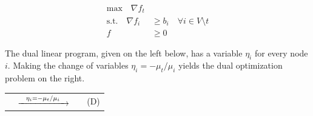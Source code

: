 \documentclass[11pt]{article}
\theoremstyle{definition}
\theoremstyle{definition}
\theoremstyle{definition}
\newcommand{\R}{\mathbb{R}}
\newcommand{\gij}{\gamma_{ij}}
\begin{document}
    \begin{align*}\tag{P}
    \text{max} \quad
    \nabla f_t& \\
    \text{s.t.} \quad
    \nabla f_i &\geq b_i \quad \forall i \in V \setminus t \\
    f &\geq 0
    \end{align*}

	The dual linear program, given on the left below, has a variable $\eta_i$ for
	every node $i$. 
	Making the change of variables $\eta_i = - \mu_t / \mu_i$ yields the
	dual optimization problem on the right.
    \vspace{0.5cm}

	\begin{tabular}{rcll}
		\hspace*{-1.05cm}
	\resizebox{0.37\textwidth}{!}{
		\fbox{
	\begin{minipage}{0.35\textwidth}
	\begin{alignat*}{4}
    \text{min} &\quad &\sum_{i \in V \setminus t} b_i \eta_i \\
    \text{s.t.}
    &   &\gij \eta_j - \eta_i &\geq 0 \quad &&\forall\; &&(i, j) \in E \\
    &   &                     &             &&          &&\ i, j \neq t \\
    &   &\gamma_{ti} \eta_i &\geq -1 \quad  &&\forall\; &&(i, t) \in E \\
    &   &-\eta_i &\geq \gamma_{it} \quad    &&\forall\; &&(t, i) \in E \\
    &   &\eta_i &\leq 0 \quad               &&\forall\; &&i \in V \setminus t
    \end{alignat*}
	\end{minipage}
}
} & 
	$\xrightarrow{\hspace*{0.25cm}\eta_i = - \mu_t / \mu_i\hspace*{0.25cm}}$
	&
	\resizebox{0.37\textwidth}{!}{
		\fbox{
	\begin{minipage}{0.4\textwidth}
    \begin{alignat*}{3}
    \text{max} &\quad &\mu_t &\sum_{j \in V \setminus t} \frac{b_j}{\mu_j}  \\
    \text{s.t.}
    &   &\gij \mu_i &\leq \mu_j \quad &&\forall\; (i, j) \in E \\
    &   &\mu_i &\in \R_{>0} \cup \infty \quad &&\forall\; i \in V \setminus t \\
    &   &\mu_t &\in \R_{>0}
    \end{alignat*}
	\end{minipage}
}
} & \hspace*{0.4cm}(D)
\end{tabular}
\vspace{0.5cm}
\end{document}

